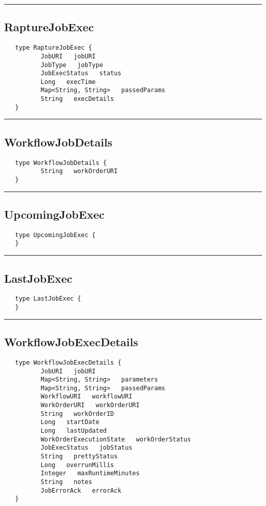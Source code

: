 \rule{15cm}{2pt}
\subsection{RaptureJobExec}
\label{type:RaptureJobExec}

\begin{verbatim}
   type RaptureJobExec {
          JobURI   jobURI
          JobType   jobType
          JobExecStatus   status
          Long   execTime
          Map<String, String>   passedParams
          String   execDetails
   }
\end{verbatim}

\rule{15cm}{2pt}
\subsection{WorkflowJobDetails}
\label{type:WorkflowJobDetails}

\begin{verbatim}
   type WorkflowJobDetails {
          String   workOrderURI
   }
\end{verbatim}

\rule{15cm}{2pt}
\subsection{UpcomingJobExec}
\label{type:UpcomingJobExec}

\begin{verbatim}
   type UpcomingJobExec {
   }
\end{verbatim}

\rule{15cm}{2pt}
\subsection{LastJobExec}
\label{type:LastJobExec}

\begin{verbatim}
   type LastJobExec {
   }
\end{verbatim}

\rule{15cm}{2pt}
\subsection{WorkflowJobExecDetails}
\label{type:WorkflowJobExecDetails}

\begin{verbatim}
   type WorkflowJobExecDetails {
          JobURI   jobURI
          Map<String, String>   parameters
          Map<String, String>   passedParams
          WorkflowURI   workflowURI
          WorkOrderURI   workOrderURI
          String   workOrderID
          Long   startDate
          Long   lastUpdated
          WorkOrderExecutionState   workOrderStatus
          JobExecStatus   jobStatus
          String   prettyStatus
          Long   overrunMillis
          Integer   maxRuntimeMinutes
          String   notes
          JobErrorAck   errorAck
   }
\end{verbatim}

